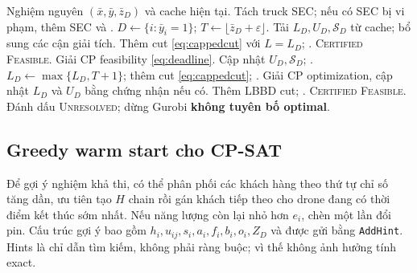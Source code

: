 \documentclass[11pt,a4paper]{article}
\theoremstyle{definition}
\theoremstyle{plain}
\theoremstyle{remark}
\begin{document}
\begin{algorithm}[htbp]
\caption{Exact-aware separation tại \texttt{MIPSOL} (rút gọn)}\label{alg:impl}
\begin{algorithmic}[1]
\Require Nghiệm nguyên $(\bar x,\bar y,\bar z_D)$ và cache hiện tại.
\State Tách truck SEC; nếu có SEC bị vi phạm, thêm SEC và \Return.
\State $D\gets\{i:\bar y_i=1\}$; $T\gets\lfloor\bar z_D+\varepsilon\rfloor$.
\State Tải $L_D,U_D,\mathcal S_D$ từ cache; bổ sung các cận giải tích.
  \State Thêm cut \eqref{eq:cappedcut} với $L=L_D$; \Return.
  \State \Return \textsc{Certified Feasible}.
\EndIf
{}
  \State Giải CP feasibility \eqref{eq:deadline}.
    \State Cập nhật $U_D,\mathcal S_D$; \Return.
    \State $L_D\gets\max\{L_D,T+1\}$; thêm cut \eqref{eq:cappedcut}; \Return.
  \EndIf
\EndFor
\State Giải CP optimization, cập nhật $L_D$ và $U_D$ bằng chứng nhận nếu có.
 \State Thêm LBBD cut; \Return.
 \State \Return \textsc{Certified Feasible}.
\Else
 \State Đánh dấu \textsc{Unresolved}; dừng Gurobi \textbf{không tuyên bố optimal}.
\EndIf
\end{algorithmic}
\end{algorithm}

\subsection{Greedy warm start cho CP-SAT}
Để gợi ý nghiệm khả thi, có thể phân phối các khách hàng theo thứ tự chỉ số tăng dần, ưu tiên tạo $H$ chain rồi gán khách tiếp theo cho drone đang có thời điểm kết thúc sớm nhất. Nếu năng lượng còn lại nhỏ hơn $e_i$, chèn một lần đổi pin. Cấu trúc gợi ý bao gồm $h_i,u_{ij},s_i,a_i,f_i,b_i,o_i,Z_D$ và được gửi bằng \texttt{AddHint}. Hints là chỉ dẫn tìm kiếm, không phải ràng buộc; vì thế không ảnh hưởng tính exact.
\end{document}
